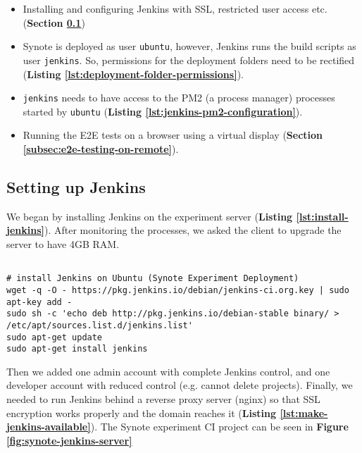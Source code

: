 \begin{itemize}

  \item Installing and configuring Jenkins with SSL, restricted user access etc. (\textbf{Section \ref{subsec:setting-up-jenkins}})

  \item Synote is deployed as user \texttt{ubuntu}, however, Jenkins runs the build scripts as user \texttt{jenkins}. So, permissions for the deployment folders need to be rectified (\textbf{Listing \ref{lst:deployment-folder-permissions}}).

  \item \texttt{jenkins} needs to have access to the PM2 (a process manager) processes started by \texttt{ubuntu} (\textbf{Listing \ref{lst:jenkins-pm2-configuration}}).

  \item Running the E2E tests on a browser using a virtual display (\textbf{Section \ref{subsec:e2e-testing-on-remote}}).

\end{itemize}

\subsection{Setting up Jenkins}
\label{subsec:setting-up-jenkins}

We began by installing Jenkins on the experiment server (\textbf{Listing \ref{lst:install-jenkins}}). After monitoring the processes, we asked the client to upgrade the server to have 4GB RAM.\\

\begin{listing}[H]
\begin{verbatim}

# install Jenkins on Ubuntu (Synote Experiment Deployment)
wget -q -O - https://pkg.jenkins.io/debian/jenkins-ci.org.key | sudo apt-key add -
sudo sh -c 'echo deb http://pkg.jenkins.io/debian-stable binary/ > /etc/apt/sources.list.d/jenkins.list'
sudo apt-get update
sudo apt-get install jenkins

\end{verbatim}
\label{lst:install-jenkins}
\end{listing}

Then we added one admin account with complete Jenkins control, and one developer account with reduced control (e.g. cannot delete projects). Finally, we needed to run Jenkins behind a reverse proxy server (nginx) so that SSL encryption works properly and the domain reaches it (\textbf{Listing \ref{lst:make-jenkins-available}}). The Synote experiment CI project can be seen in \textbf{Figure \ref{fig:synote-jenkins-server}}\\

